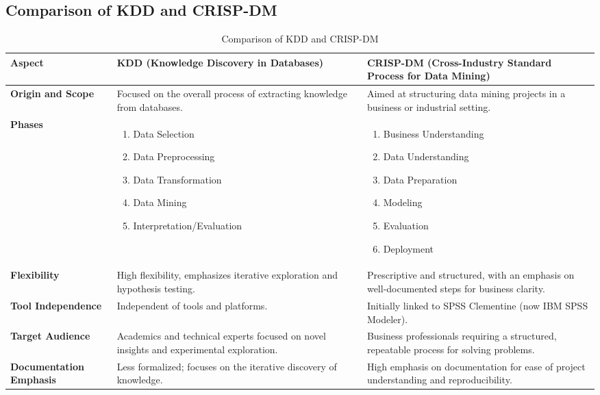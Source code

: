 \subsection{Comparison of KDD and CRISP-DM}
\begin{table}[h!]
    \centering
    \begin{tabular}{@{}p{3.5cm}p{5.5cm}p{5.5cm}@{}}
        \toprule
        \textbf{Aspect} & \textbf{KDD (Knowledge Discovery in Databases)} & \textbf{CRISP-DM (Cross-Industry Standard Process for Data Mining)} \\ \midrule
        \textbf{Origin and Scope} & Focused on the overall process of extracting knowledge from databases. & Aimed at structuring data mining projects in a business or industrial setting. \\ \midrule
        \textbf{Phases} & 
        \begin{enumerate}
            \item Data Selection
            \item Data Preprocessing
            \item Data Transformation
            \item Data Mining
            \item Interpretation/Evaluation
        \end{enumerate} &
        \begin{enumerate}
            \item Business Understanding
            \item Data Understanding
            \item Data Preparation
            \item Modeling
            \item Evaluation
            \item Deployment
        \end{enumerate} \\ \midrule
        \textbf{Flexibility} & High flexibility, emphasizes iterative exploration and hypothesis testing. & Prescriptive and structured, with an emphasis on well-documented steps for business clarity. \\ \midrule
        \textbf{Tool Independence} & Independent of tools and platforms. & Initially linked to SPSS Clementine (now IBM SPSS Modeler). \\ \midrule
        \textbf{Target Audience} & Academics and technical experts focused on novel insights and experimental exploration. & Business professionals requiring a structured, repeatable process for solving problems. \\ \midrule
        \textbf{Documentation Emphasis} & Less formalized; focuses on the iterative discovery of knowledge. & High emphasis on documentation for ease of project understanding and reproducibility. \\ 
        \bottomrule
    \end{tabular}
    \caption{Comparison of KDD and CRISP-DM}
    \label{tab:comparison}
\end{table}

